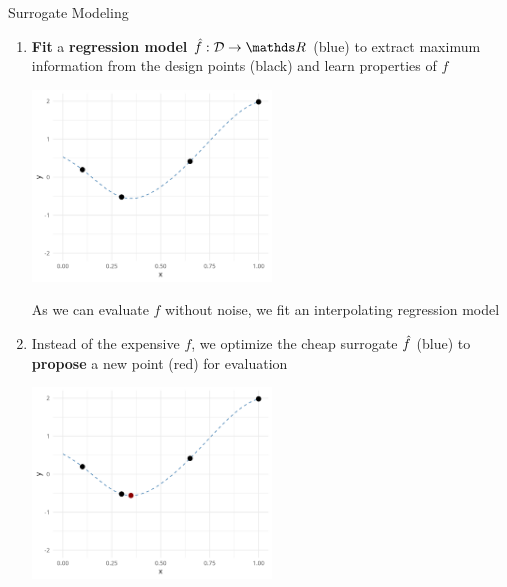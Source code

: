 \documentclass[11pt,compress,t,notes=noshow, xcolor=table]{beamer}
\begin{document}
\begin{vbframe}{Surrogate Modeling}
\begin{enumerate}
\item \textbf{Fit} a \textbf{regression model} $\hat{f}: \D \rightarrow \R$ (blue) to extract maximum information from the design points (black) and learn properties of $f$
\vspace{+.05cm}

\begin{center}
  \includegraphics[width = 0.5\textwidth]{figure_man/loop_1.png}
\end{center}

\vspace{-.1cm}
As we can evaluate $f$ without noise, we fit an interpolating regression model

\framebreak 

\item Instead of the expensive $f$, we optimize the cheap 
 surrogate $\hat{f}$ (blue) to \textbf{propose} a new point (red) for evaluation 
\vspace{+.05cm}

\begin{center}
  \includegraphics[width = 0.5\textwidth]{figure_man/loop_2.png}
\end{center}



\end{enumerate}
\end{vbframe}
\end{document}
